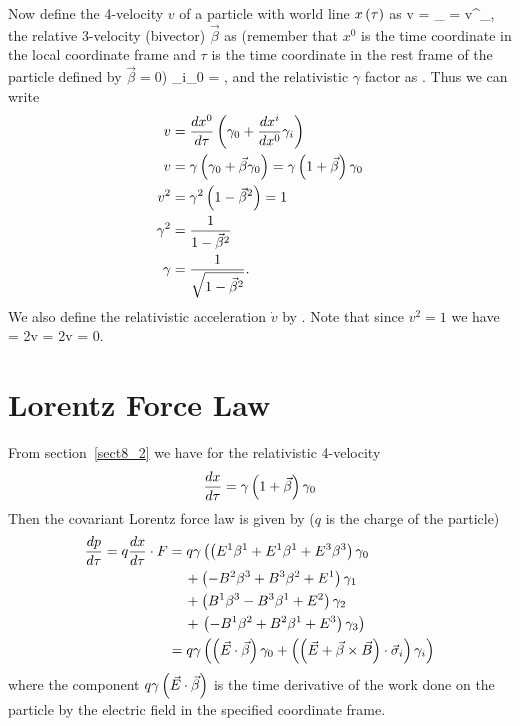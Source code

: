Now define the 4-velocity $v$ of a particle with world line ${x}\left ( {\tau} \right )$ as
\be
	v \equiv {} = \gamma_{\nu} = v^{\nu}\gamma_{\nu},
\ee
the relative 3-velocity (bivector) $\vec{\beta}$ as (remember that $x^{0}$ is the time coordinate in the local coordinate frame
and $\tau$ is the time coordinate in the rest frame of the particle defined by $\vec{\beta}=0$)
\be
	\vec{\beta} \equiv {}\gamma_{i}\gamma_{0} = ,
\ee
and the relativistic $\gamma$ factor as
\be
	\gamma \equiv {}.
\ee
Thus we can write
\begin{align}
	v &= \displaystyle\frac{d{x^{0}}}{d{\tau}}\left ( {\gamma_{0}+\displaystyle\frac{d{x^{i}}}{d{x^{0}}}\gamma_{i}} \right ) \\
	v &= \gamma\left ( {\gamma_{0}+\vec{\beta}\gamma_{0}} \right ) = \gamma\left ( {1+\vec{\beta}} \right )\gamma_{0} \\
	v^{2} &= \gamma^{2}\left ( {1-\vec{\beta}^{2}} \right ) = 1 \\
	\gamma^{2} &= \displaystyle\frac{1}{1-\vec{\beta}^{2}} \\
	\gamma &= \displaystyle\frac{1}{\sqrt{1-\vec{\beta}^{2}}}.
\end{align}
We also define the relativistic acceleration $\dot{v}$ by
\be
	 \equiv {}.
\ee
Note that since $v^{2}=1$ we have
\be
	\deriv{}{\tau} = 2v\cdot{} = 2v\cdot{} = 0.
\ee


\section{Lorentz Force Law}
From section~\ref{sect8_2} we have for the relativistic 4-velocity
\begin{equation}
\displaystyle\frac{d{x}}{d{\tau}} = \gamma\left ( {1+\vec{\beta}} \right )\gamma_{0}
\end{equation}
Then the covariant Lorentz force law is given by ($q$ is the charge of the particle)
\begin{align}
\displaystyle\frac{d{p}}{d{\tau}} = q\displaystyle\frac{d{x}}{d{\tau}}\cdot F &= q\gamma\left (\left ( {E^{1}} {\beta^{1}} + {E^{1}} {\beta^{1}} + {E^{3}} {\beta^{3}}\right ) {\gamma}_{0} \right . \nonumber \\
                & \hspace{12pt}+ \left ( - {B^{2}} {\beta^{3}} + {B^{3}} {\beta^{2}} + {E^{1}}\right ) {\gamma}_{1} \nonumber \\
                & \hspace{12pt}+ \left ( {B^{1}} {\beta^{3}} - {B^{3}} {\beta^{1}} + {E^{2}}\right ) {\gamma}_{2}  \nonumber \\
                & \hspace{12pt}+ \left . \left ( - {B^{1}} {\beta^{2}} + {B^{2}} {\beta^{1}} + {E^{3}}\right ) {\gamma}_{3} \right )  \\
                &=  q\gamma\left ( {\left ( {\vec{E}\cdot\vec{\beta}} \right )\gamma_{0}+\left ( {\left ( {\vec{E}+\vec{\beta}\times\vec{B}} \right )\cdot\vec{\sigma}_{i}} \right )\gamma_{i}} \right )
\end{align}
where the component $q\gamma\left ( {\vec{E}\cdot\vec{\beta}} \right )$ is the time derivative of the work done on the 
particle by the electric field in the specified coordinate frame.
